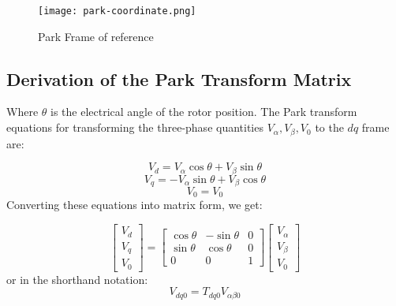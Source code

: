 \begin{figure}[h]
    \centering
    \texttt{[image: park-coordinate.png]}
    \caption{Park Frame of reference}
    \label{fig:Park Frame of reference}
\end{figure}
\subsection{Derivation of the Park Transform Matrix}

\noindent
Where \( \theta \) is the electrical angle of the rotor position.
\noindent
The Park transform equations for transforming the three-phase quantities \(
V_\alpha, V_\beta, V_0 \) to the \( dq \) frame are:

\begin{equation*}
    V_d = V_\alpha \cos \theta + V_\beta \sin \theta
\end{equation*}
\begin{equation*}
    V_q = -V_\alpha \sin \theta + V_\beta \cos \theta
\end{equation*}
\begin{equation*}
    V_0 = V_0
\end{equation*}
\noindent
Converting these equations into matrix form, we get:

\begin{equation*}
    \begin{bmatrix}
        V_d \\
        V_q \\
        V_0
    \end{bmatrix}
    =
    \begin{bmatrix}
        \cos \theta & -\sin \theta & 0 \\
        \sin \theta & \cos \theta  & 0 \\
        0           & 0            & 1
    \end{bmatrix}
    \begin{bmatrix}
        V_\alpha \\
        V_\beta  \\
        V_0
    \end{bmatrix}
\end{equation*}
or in the shorthand notation:
\begin{equation*}
    V_{dq0} = T_{dq0} V_{\alpha\beta0}
\end{equation*}

